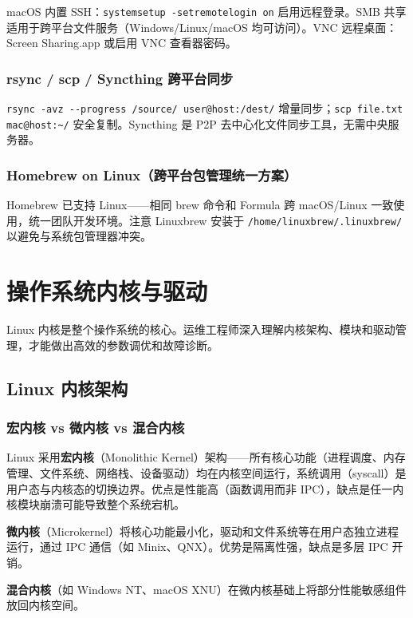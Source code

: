 \documentclass[12pt,UTF8]{ctexbook}
\begin{document}
macOS 内置 SSH：\verb|systemsetup -setremotelogin on| 启用远程登录。SMB 共享适用于跨平台文件服务（Windows/Linux/macOS 均可访问）。VNC 远程桌面：Screen Sharing.app 或启用 VNC 查看器密码。

    \subsection{rsync / scp / Syncthing 跨平台同步}

\verb|rsync -avz --progress /source/ user@host:/dest/| 增量同步；\verb|scp file.txt mac@host:~/| 安全复制。Syncthing 是 P2P 去中心化文件同步工具，无需中央服务器。

    \subsection{Homebrew on Linux（跨平台包管理统一方案）}

Homebrew 已支持 Linux——相同 brew 命令和 Formula 跨 macOS/Linux 一致使用，统一团队开发环境。注意 Linuxbrew 安装于 \verb|/home/linuxbrew/.linuxbrew/| 以避免与系统包管理器冲突。

\chapter{操作系统内核与驱动}
\label{chap:os-kernel-driver}

Linux 内核是整个操作系统的核心。运维工程师深入理解内核架构、模块和驱动管理，才能做出高效的参数调优和故障诊断。

\section{Linux 内核架构}

\subsection{宏内核 vs 微内核 vs 混合内核}

Linux 采用\textbf{宏内核}（Monolithic Kernel）架构——所有核心功能（进程调度、内存管理、文件系统、网络栈、设备驱动）均在内核空间运行，系统调用（syscall）是用户态与内核态的切换边界。优点是性能高（函数调用而非 IPC），缺点是任一内核模块崩溃可能导致整个系统宕机。

\textbf{微内核}（Microkernel）将核心功能最小化，驱动和文件系统等在用户态独立进程运行，通过 IPC 通信（如 Minix、QNX）。优势是隔离性强，缺点是多层 IPC 开销。

\textbf{混合内核}（如 Windows NT、macOS XNU）在微内核基础上将部分性能敏感组件放回内核空间。
\end{document}
